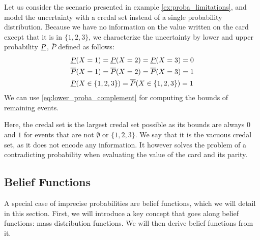 \begin{example}
    Let us consider the scenario presented in example \ref{ex:proba_limitations}, and model the uncertainty with a credal set instead of a single probability distribution. Because we have no information on the value written on the card except that it is in $\{1,2,3\}$, we characterize the uncertainty by lower and upper probability $\underline{P}$, $\overline{P}$ defined as follows:
    \begin{align*}
        &\underline{P}(X=1) = \underline{P}(X=2)= \underline{P}(X=3) = 0\\
        &\overline{P}(X=1) = \overline{P}(X=2)= \overline{P}(X=3) = 1\\
        &\underline{P}(X\in\{1,2,3\}) = \overline{P}(X\in\{1,2,3\}) = 1
    \end{align*}
    We can use \cref{eq:lower_proba_complement} for computing the bounds of remaining events.
    
    Here, the credal set is the largest credal set possible as its bounds are always $0$ and $1$ for events that are not $\emptyset$ or $\{1,2,3\}$. We say that it is the vacuous credal set, as it does not encode any information. It however solves the problem of a contradicting probability when evaluating the value of the card and its parity.
\end{example}

\subsection{Belief Functions}\label{sec:belief_functions}
A special case of imprecise probabilities are belief functions, which we will detail in this section. First, we will introduce a key concept that goes along belief functions: mass distribution functions. We will then derive belief functions from it.

